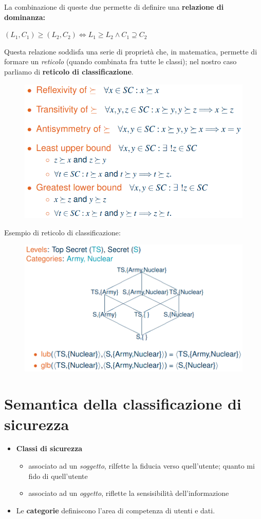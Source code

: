 \documentclass{report}
\begin{document}
\noindent La combinazione di queste due permette di definire una \textbf{relazione di dominanza:}
\begin{center}
    $(L_1, C_1) \geq (L_2, C_2) \Leftrightarrow L_1 \geq L_2 \land C_1 \supseteq C_2$
\end{center}

\noindent Questa relazione soddisfa una serie di proprietà che, in matematica, permette di formare 
un \textit{reticolo} (quando combinata fra tutte le classi); nel nostro caso parliamo 
di \textbf{reticolo di classificazione}.

\begin{figure}[H]
    \centering
    \includegraphics[width=0.8\linewidth]{images/props.png}
\end{figure}

\noindent Esempio di reticolo di classificazione:
\begin{figure}[H]
    \centering
    \includegraphics[width=0.8\linewidth]{images/reticolo.png}
\end{figure}

\newpage
\section{Semantica della classificazione di sicurezza}
\begin{itemize}
    \item \textbf{Classi di sicurezza}
    \begin{itemize}
        \item associato ad un \textit{soggetto}, rilfette la fiducia verso quell'utente; quanto mi fido di quell'utente 
        \item associato ad un \textit{oggetto}, riflette la sensisibilità dell'informazione
    \end{itemize}
    \item Le \textbf{categorie} definiscono l'area di competenza di utenti e dati.
\end{itemize}
\end{document}
